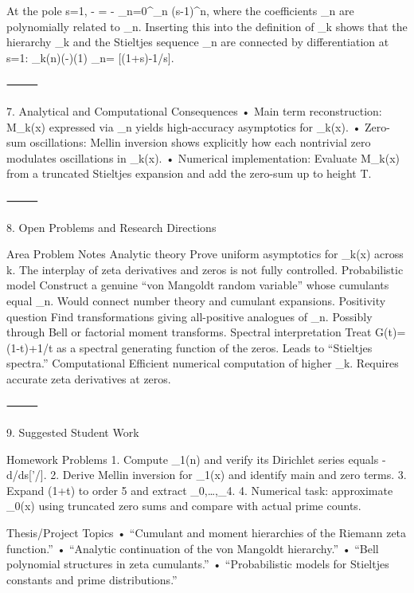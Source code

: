At the pole s=1,
-
=  - \sum_{n=0}^\infty \eta_n (s-1)^n,
where the coefficients \eta_n are polynomially related to \gamma_n.
Inserting this into the definition of \Lambda_k shows that the hierarchy \Lambda_k and the Stieltjes sequence \gamma_n are connected by differentiation at s=1:
\Lambda_k(n)\;\leftrightarrow\;\!\left(-\right)(1)
\;\;\;\;\gamma_n=\,\,[\zeta(1+s)-1/s].

⸻

7. Analytical and Computational Consequences
	•	Main term reconstruction: M_k(x) expressed via \gamma_n yields high-accuracy asymptotics for \Psi_k(x).
	•	Zero-sum oscillations: Mellin inversion shows explicitly how each nontrivial zero modulates oscillations in \Psi_k(x).
	•	Numerical implementation:
Evaluate M_k(x) from a truncated Stieltjes expansion and add the zero-sum up to height T.

⸻

8. Open Problems and Research Directions

Area	Problem	Notes
Analytic theory	Prove uniform asymptotics for \Psi_k(x) across k.	The interplay of zeta derivatives and zeros is not fully controlled.
Probabilistic model	Construct a genuine “von Mangoldt random variable” whose cumulants equal \gamma_n.	Would connect number theory and cumulant expansions.
Positivity question	Find transformations giving all-positive analogues of \gamma_n.	Possibly through Bell or factorial moment transforms.
Spectral interpretation	Treat G(t)=\zeta(1-t)+1/t as a spectral generating function of the zeros.	Leads to “Stieltjes spectra.”
Computational	Efficient numerical computation of higher \Psi_k.	Requires accurate zeta derivatives at zeros.


⸻

9. Suggested Student Work

Homework Problems
	1.	Compute \Lambda_1(n) and verify its Dirichlet series equals -d/ds[\zeta’/\zeta].
	2.	Derive Mellin inversion for \Psi_1(x) and identify main and zero terms.
	3.	Expand \zeta(1+t) to order 5 and extract \gamma_0,\dots,\gamma_4.
	4.	Numerical task: approximate \Psi_0(x) using truncated zero sums and compare with actual prime counts.

Thesis/Project Topics
	•	“Cumulant and moment hierarchies of the Riemann zeta function.”
	•	“Analytic continuation of the von Mangoldt hierarchy.”
	•	“Bell polynomial structures in zeta cumulants.”
	•	“Probabilistic models for Stieltjes constants and prime distributions.”

